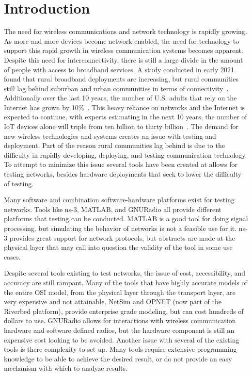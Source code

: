 \chapter{Introduction}
\label{ch:introduction}
The need for wireless communications and network technology is rapidly growing.
As more and more devices become network-enabled, the need for technology to support this rapid growth in wireless communication systems becomes apparent.
Despite this need for interconnectivity, there is still a large divide in the amount of people with access to broadband services.
A study conducted in early 2021 found that rural broadband deployments are increasing, but rural communities still lag behind suburban and urban communities in terms of connectivity~\cite{digital_divide}.
Additionally over the last 10 years, the number of U.S. adults that rely on the Internet has grown by 10\%~\cite{broadband_factsheet}.
This heavy reliance on networks and the Internet is expected to continue, with experts estimating in the next 10 years, the number of IoT devices alone will triple from ten billion to thirty billion~\cite{iot_spread}.
The demand for new wireless technologies and systems creates an issue with testing and deployment.
Part of the reason rural communities lag behind is due to the difficulty in rapidly developing, deploying, and testing communication technology.
To attempt to minimize this issue several tools have been created at allows for testing networks, besides hardware deployments that seek to lower the difficulty of testing.\par

Many software and combination software-hardware platforms exist for testing networks.
Tools like ns-3, MATLAB, and GNURadio all provide different platforms that testing can be conducted.
MATLAB is a good tool for doing signal processing, but simulating the behavior of networks is not a feasible use for it.
ns-3 provides great support for network protocols, but abstracts are made at the physical layer that may call into question the validity of the tool in some use cases.\par

Despite several tools existing to test networks, the issue of cost, accessibility, and accuracy are still rampant.
Many of the tools that have highly accurate models of the entire OSI model, from the physical layer through the transport layer, are very expensive and not attainable.
NetSim and OPNET (now part of the Riverbed platform), provide enterprise grade modeling, but can cost hundreds of dollars to use.
GNURadio allows for interactions with wireless communication hardware and software defined radios, but the hardware component is still an expensive cost looking to be avoided.
Another issue with several of the existing tools is there complexity to set up.
Many tools require extensive programming knowledge to be able to achieve the desired result, or do not provide an easy mechanism with which to analyze results.\par

